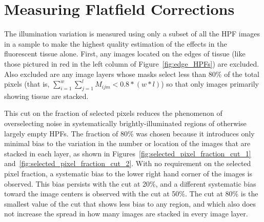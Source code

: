 \documentclass[letterpaper,11pt]{article}
\newcommand{\reffig}[1]{Figure~\ref{#1}}
\begin{document}
\section{Measuring Flatfield Corrections}
\label{sec:measuring_flatfield_corrections}

The illumination variation is measured using only a subset of all the HPF images in a sample to make the highest quality estimation of the effects in the fluorescent tissue alone. First, any images located on the edges of tissue (like those pictured in red in the left column of \reffig{fig:edge_HPFs}) are excluded. Also excluded are any image layers whose masks select less than 80\% of the total pixels (that is, $\sum_{i=1}^{w}\sum_{j=1}^{l}M_{ijm}<0.8*(w*l)$) so that only images primarily showing tissue are stacked. 

This cut on the fraction of selected pixels reduces the phenomenon of overselecting noise in systematically brightly-illuminated regions of otherwise largely empty HPFs. The fraction of 80\% was chosen because it introduces only minimal bias to the variation in the number or location of the images that are stacked in each layer, as shown in Figures~\ref{fig:selected_pixel_fraction_cut_1} and~\ref{fig:selected_pixel_fraction_cut_2}. With no requirement on the selected pixel fraction, a systematic bias to the lower right hand corner of the images is observed. This bias persists with the cut at 20\%, and a different systematic bias toward the image centers is observed with the cut at 50\%. The cut at 80\% is the smallest value of the cut that shows less bias to any region, and which also does not increase the spread in how many images are stacked in every image layer.
\end{document}
